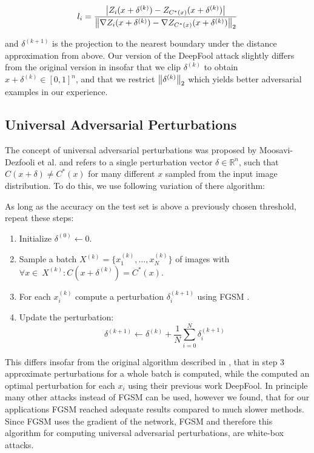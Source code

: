 \begin{equation}
l_i = 
\frac{
	\left \lvert Z_i(x + \delta^{(k)}) - Z_{C^*(x)}(x + \delta^{(k)}) \right \rvert
}
{
	\left \lVert \nabla Z_i(x + \delta^{(k)}) - \nabla Z_{C^*(x)}(x + \delta^{(k)}) \right \rVert _2
}
\end{equation}


and $\delta^{(k+1)}$ is the projection to the nearest boundary under the distance approximation from above. Our version of the DeepFool attack slightly differs from the original version in \cite{deepfool} insofar that we clip $\delta^{(k)}$ to obtain $x + \delta^{(k)} \in [0,1]^n$, and that we restrict $\left \lVert \delta^{(k)} \right \rVert _2$ which yields better adversarial examples in our experience.

\subsection{Universal Adversarial Perturbations}
The concept of universal adversarial perturbations was proposed by Moosavi-Dezfooli et al. \cite{universal} and refers to a single perturbation vector $\delta \in \mathbb{R}^n$, such that $C(x + \delta) \neq C^*(x)$ for many different $x$ sampled from the input image distribution.
To do this, we use following variation of there algorithm:

As long as the accuracy on the test set is above a previously chosen threshold, repeat these steps:
\begin{enumerate}
	\item Initialize $\delta^{(0)} \gets 0$.
	\item Sample a batch $X^{(k)} = \{x_1^{(k)}, ..., x_N^{(k)}\}$ of images with $\forall x \in\ X^{(k)}:  C(x + \delta^{(k)}) = C^*(x)$.
	\item For each $x_i^{(k)}$ compute a perturbation $\delta_i^{(k+1)}$ using FGSM \cite{fgsm}.
	\item Update the perturbation: $$\delta^{(k+1)} \gets \delta^{(k)} + \frac{1}{N} \sum\limits_{i=0}^N \delta_i^{(k+1)}$$
\end{enumerate}

This differs insofar from the original algorithm described in \cite{universal}, that in step 3 approximate perturbations for a whole batch is computed, while the computed an optimal perturbation for each $x_i$ using their previous work DeepFool.  In principle many other attacks instead of FGSM can be used, however we found, that for our applications FGSM reached adequate results compared to much slower methods. Since FGSM uses the gradient of the network, FGSM and therefore this algorithm for computing universal adversarial perturbations, are white-box attacks.
